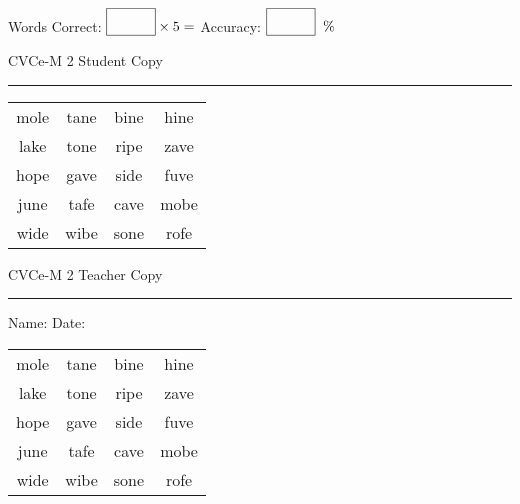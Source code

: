 \documentclass{memoir}
\begin{document}
\small

Words Correct: $\fbox{\phantom{\huge 100}} \times 5 = $ Accuracy: $\fbox{\phantom{\huge 100}}\;\; \%$ 

\vfill

\newpage


\footnotesize \noindent
CVCe-M 2 \hfill Student Copy
\smallskip
\hrule

\Large

\setlength{\tabcolsep}{14pt}
\def\arraystretch{2}

{\selectfont


\begin{vplace}[0.5]
\begin{center}
\begin{tabular}{cccc}
mole & tane & bine & hine \\
lake & tone & ripe & zave \\
hope & gave & side & fuve \\
june & tafe & cave & mobe \\
wide & wibe & sone & rofe \\
\end{tabular}
\end{center}
\end{vplace}

}

\newpage

\footnotesize \noindent
CVCe-M 2 \hfill Teacher Copy
\smallskip
\hrule

\small

\vfill

\noindent
Name: \underline{\hspace{1.75in}} \hfill Date: \underline{\hspace{1in}}

\Large

{\selectfont


\begin{vplace}[0.5]
\begin{center}
\begin{tabular}{cccc}
mole & tane & bine & hine \\
lake & tone & ripe & zave \\
hope & gave & side & fuve \\
june & tafe & cave & mobe \\
wide & wibe & sone & rofe \\
\end{tabular}
\end{center}
\end{vplace}



}
\end{document}
